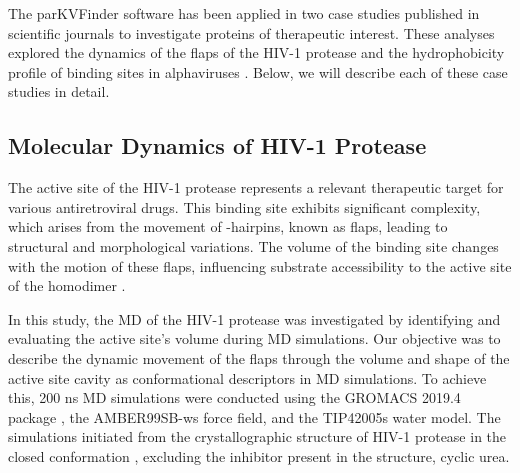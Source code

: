 \documentclass[Ingles]{phdthesis}
\begin{document}
The parKVFinder software has been applied in two case studies published in scientific journals to investigate proteins of therapeutic interest. These analyses explored the dynamics of the flaps of the \ac{HIV-1} protease \cite{guerra2020} and the hydrophobicity profile of binding sites in alphaviruses \cite{ribeiro2021}. Below, we will describe each of these case studies in detail.

\subsection{Molecular Dynamics of HIV-1 Protease \label{sec:md-hiv1-protease}}

The active site of the HIV-1 protease represents a relevant therapeutic target for various antiretroviral drugs. This binding site exhibits significant complexity, which arises from the movement of \textbeta-hairpins, known as flaps, leading to structural and morphological variations. The volume of the binding site changes with the motion of these flaps, influencing substrate accessibility to the active site of the homodimer \cite{lam1994,soares2016}.

In this study, the \acs{MD} of the HIV-1 protease was investigated by identifying and evaluating the active site's volume during \acs{MD} simulations. Our objective was to describe the dynamic movement of the flaps through the volume and shape of the active site cavity as conformational descriptors in \acs{MD} simulations. To achieve this, 200 ns \acs{MD} simulations were conducted using the GROMACS 2019.4 package \cite{gromacs}, the AMBER99SB-ws force field, and the TIP42005s water model. The simulations initiated from the crystallographic structure of HIV-1 protease in the closed conformation \cite{lam1994}, excluding the inhibitor present in the structure, cyclic urea.
\end{document}
